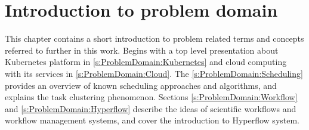 \thispagestyle{only-cfoot}
\section{Introduction to problem domain}\label{s:ProblemDomain} %

This chapter contains a short introduction to problem related terms and concepts referred to further in this work.
Begins with a top level presentation about Kubernetes platform in \ref{s:ProblemDomain:Kubernetes} and cloud computing with its services in \ref{s:ProblemDomain:Cloud}.
The \ref{s:ProblemDomain:Scheduling} provides an overview of known scheduling approaches and algorithms, and explains the task clustering phenomenon.
Sections \ref{s:ProblemDomain:Workflow} and \ref{s:ProblemDomain:Hyperflow} describe the ideas of scientific workflows and workflow management systems, and cover the introduction to Hyperflow system.











